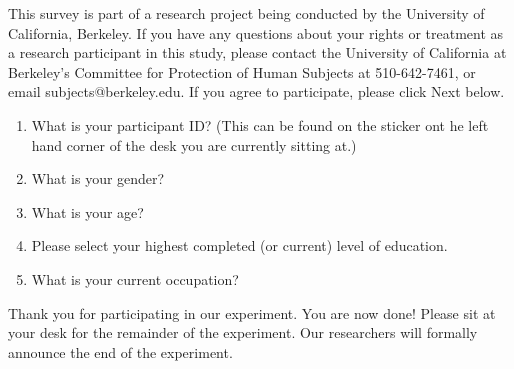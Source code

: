 \documentclass[USenglish,oneside,twocolumn]{article}
\begin{document}
This survey is part of a research project being conducted by the University of California, Berkeley. If you have any questions about your rights or treatment as a research participant in this study, please contact the University of California at Berkeley's Committee for Protection of Human Subjects at 510-642-7461, or email subjects@berkeley.edu. If you agree to participate, please click Next below.\\

\begin{enumerate}
\item{What is your participant ID? (This can be found on the sticker ont he left hand corner of the desk you are currently sitting at.)}
\item{What is your gender?}
\item{What is your age?}
\item{Please select your highest completed (or current) level of education}.
\item{What is your current occupation?}  
\end{enumerate}

Thank you for participating in our experiment. You are now done! Please sit at your desk for the remainder of the experiment. Our researchers will formally announce the end of the experiment. 
\end{document}
